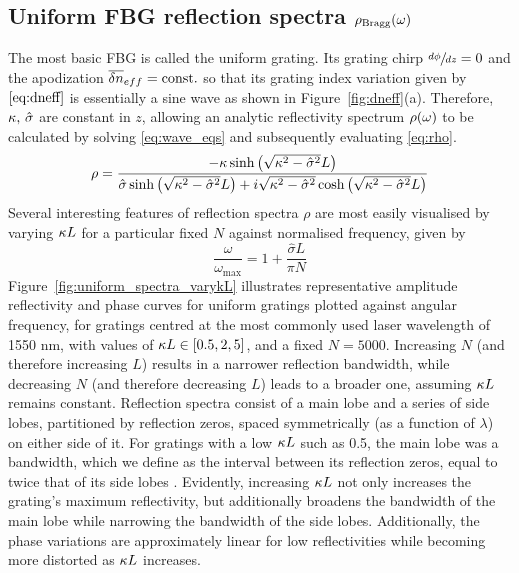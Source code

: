 \subsection{Uniform FBG reflection spectra $\rho_\text{Bragg}(\omega)$}
\label{subsec:FBG_feedback}
%
The most basic FBG is called the uniform grating. 
Its grating chirp $\sfrac{d\phi}{dz} = 0$ and the apodization $\overline{\delta n}_{eff}=\text{const.}$ so that its grating index variation given by $\eqref{eq:dneff}$ is essentially a sine wave as shown in Figure~\ref{fig:dneff}(a). 
Therefore, $\kappa, \, \hat{\sigma}$ are constant in $z$, allowing an analytic reflectivity spectrum $\rho(\omega)$ to be calculated by solving \eqref{eq:wave_eqs} and subsequently evaluating \eqref{eq:rho}.
%
\begin{equation}
\label{eq:uniform_rho}
    \rho = \frac{-\kappa \sinh\left(\sqrt{\kappa^2 - \hat{\sigma}^2}L\right)}{\hat{\sigma} \sinh\left(\sqrt{\kappa^2 - \hat{\sigma}^2}L\right) + i\sqrt{\kappa^2 - \hat{\sigma}^2} \cosh\left(\sqrt{\kappa^2 - \hat{\sigma}^2}L\right)}
\end{equation}
%
Several interesting features of reflection spectra $\rho$ are most easily visualised by varying $\kappa L$ for a particular fixed $N$ against normalised frequency, given by \cite{erdogan1997fiber}
%
\begin{equation*}
    \frac{\omega}{\omega_\text{max}} = 1 + \frac{\hat{\sigma} L}{\pi N}
\end{equation*}
%
Figure~\ref{fig:uniform_spectra_varykL} illustrates representative amplitude reflectivity and phase curves for uniform gratings plotted against angular frequency, 
for gratings centred at the most commonly used laser wavelength of 1550 nm, with values of $\kappa L \in [0.5, 2, 5]$, and a fixed $N = 5000$. 
Increasing $N$ (and therefore increasing $L$) results in a narrower reflection bandwidth, while decreasing $N$ (and therefore decreasing $L$) leads to a broader one, assuming $\kappa L$ remains constant. 
Reflection spectra consist of a main lobe and a series of side lobes, partitioned by reflection zeros, spaced symmetrically (as a function of $\lambda$) on either side of it. 
For gratings with a low $\kappa L$ such as 0.5, the main lobe was a bandwidth, which we define as the interval between its reflection zeros, equal to twice that of its side lobes \cite{erdogan1997fiber}. 
Evidently, increasing $\kappa L$ not only increases the grating's maximum reflectivity, but additionally broadens the bandwidth of the main lobe while narrowing the bandwidth of the side lobes. 
Additionally, the phase variations are approximately linear for low reflectivities while becoming more distorted as $\kappa L$ increases.

